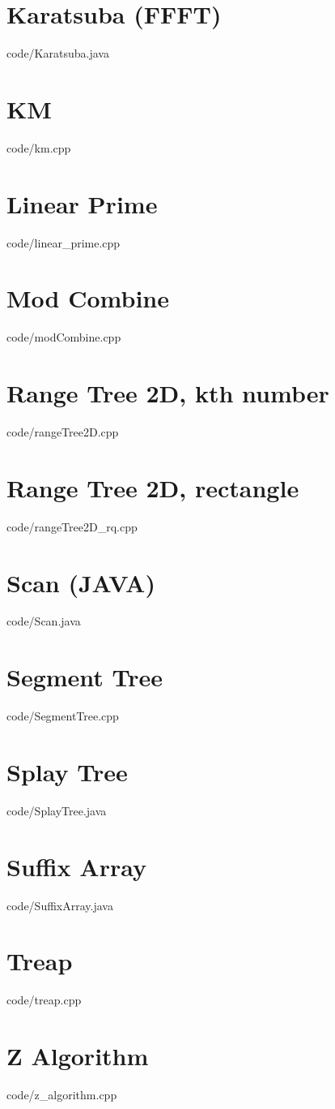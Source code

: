 \documentclass [landscape,10pt,a4paper,twocolumn]{article}
\begin{document}
\section{Karatsuba (FFFT)}
 {code/Karatsuba.java}
\section{KM}
 {code/km.cpp}
\section{Linear Prime}
 {code/linear_prime.cpp}
\section{Mod Combine}
 {code/modCombine.cpp}
\section{Range Tree 2D, kth number}
 {code/rangeTree2D.cpp}
\section{Range Tree 2D, rectangle}
 {code/rangeTree2D_rq.cpp}
\section{Scan (JAVA)}
 {code/Scan.java}
\section{Segment Tree}
 {code/SegmentTree.cpp}
\section{Splay Tree}
 {code/SplayTree.java}
\section{Suffix Array}
 {code/SuffixArray.java}
\section{Treap}
 {code/treap.cpp}
\section{Z Algorithm}
 {code/z_algorithm.cpp}
\newpage

\end{document}
